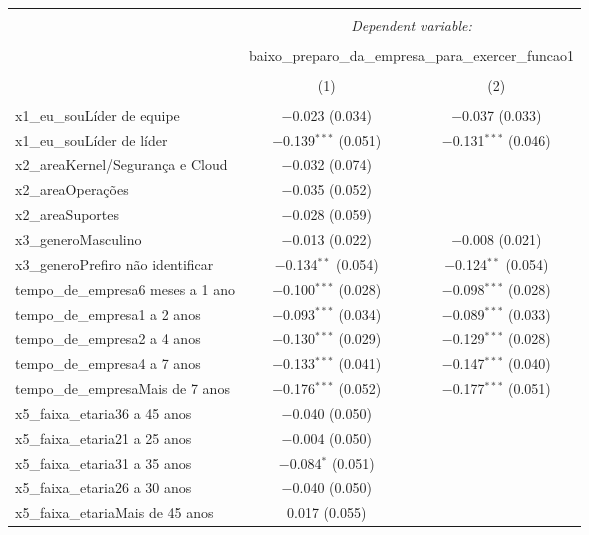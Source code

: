 \documentclass[]{book}
\begin{document}
\begin{table}[!htbp] \centering 
  \caption{} 
  \label{} 
\begin{tabular}{@{\extracolsep{5pt}}lcc} 
\\[-1.8ex]\hline 
\hline \\[-1.8ex] 
 & \multicolumn{2}{c}{\textit{Dependent variable:}} \\ 
\cline{2-3} 
\\[-1.8ex] & \multicolumn{2}{c}{baixo\_preparo\_da\_empresa\_para\_exercer\_funcao1} \\ 
\\[-1.8ex] & (1) & (2)\\ 
\hline \\[-1.8ex] 
 x1\_eu\_souLíder de equipe & $-$0.023 (0.034) & $-$0.037 (0.033) \\ 
  x1\_eu\_souLíder de líder & $-$0.139$^{***}$ (0.051) & $-$0.131$^{***}$ (0.046) \\ 
  x2\_areaKernel/Segurança e Cloud & $-$0.032 (0.074) &  \\ 
  x2\_areaOperações & $-$0.035 (0.052) &  \\ 
  x2\_areaSuportes & $-$0.028 (0.059) &  \\ 
  x3\_generoMasculino & $-$0.013 (0.022) & $-$0.008 (0.021) \\ 
  x3\_generoPrefiro não identificar & $-$0.134$^{**}$ (0.054) & $-$0.124$^{**}$ (0.054) \\ 
  tempo\_de\_empresa6 meses a 1 ano & $-$0.100$^{***}$ (0.028) & $-$0.098$^{***}$ (0.028) \\ 
  tempo\_de\_empresa1 a 2 anos & $-$0.093$^{***}$ (0.034) & $-$0.089$^{***}$ (0.033) \\ 
  tempo\_de\_empresa2 a 4 anos & $-$0.130$^{***}$ (0.029) & $-$0.129$^{***}$ (0.028) \\ 
  tempo\_de\_empresa4 a 7 anos & $-$0.133$^{***}$ (0.041) & $-$0.147$^{***}$ (0.040) \\ 
  tempo\_de\_empresaMais de 7 anos & $-$0.176$^{***}$ (0.052) & $-$0.177$^{***}$ (0.051) \\ 
  x5\_faixa\_etaria36 a 45 anos & $-$0.040 (0.050) &  \\ 
  x5\_faixa\_etaria21 a 25 anos & $-$0.004 (0.050) &  \\ 
  x5\_faixa\_etaria31 a 35 anos & $-$0.084$^{*}$ (0.051) &  \\ 
  x5\_faixa\_etaria26 a 30 anos & $-$0.040 (0.050) &  \\ 
  x5\_faixa\_etariaMais de 45 anos & 0.017 (0.055) &  \\ 

\end{tabular}
\end{table}
\end{document}
